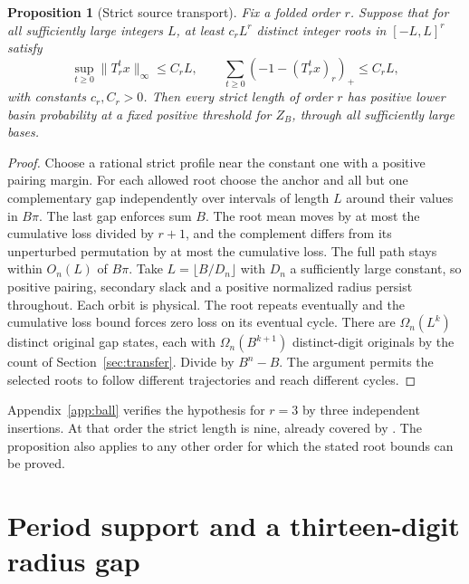 \documentclass[11pt,reqno]{amsart}
\newtheorem{proposition}[theorem]{Proposition}
\theoremstyle{definition}
\begin{document}
\begin{proposition}[Strict source transport]\label{prop:source}
Fix a folded order \(r\). Suppose that for all sufficiently large integers \(L\), at least \(c_rL^r\) distinct integer roots in \([-L,L]^r\) satisfy
\[
 \sup_{t\ge0}\|T_r^t x\|_\infty\le C_rL,\qquad
 \sum_{t\ge0}(-1-(T_r^t x)_r)_+\le C_rL,
\]
with constants \(c_r,C_r>0\). Then every strict length of order \(r\) has positive lower basin probability at a fixed positive threshold for \(Z_B\), through all sufficiently large bases.
\end{proposition}
\begin{proof}
Choose a rational strict profile near the constant one with a positive pairing margin. For each allowed root choose the anchor and all but one complementary gap independently over intervals of length \(L\) around their values in \(B\pi\). The last gap enforces sum \(B\). The root mean moves by at most the cumulative loss divided by \(r+1\), and the complement differs from its unperturbed permutation by at most the cumulative loss. The full path stays within \(O_n(L)\) of \(B\pi\). Take \(L=\lfloor B/D_n\rfloor\) with \(D_n\) a sufficiently large constant, so positive pairing, secondary slack and a positive normalized radius persist throughout. Each orbit is physical. The root repeats eventually and the cumulative loss bound forces zero loss on its eventual cycle. There are \(\Omega_n(L^k)\) distinct original gap states, each with \(\Omega_n(B^{k+1})\) distinct-digit originals by the count of Section~\ref{sec:transfer}. Divide by \(B^n-B\). The argument permits the selected roots to follow different trajectories and reach different cycles.
\end{proof}
Appendix~\ref{app:ball} verifies the hypothesis for \(r=3\) by three independent insertions. At that order the strict length is nine, already covered by \cite{G9}. The proposition also applies to any other order for which the stated root bounds can be proved.

\section{Period support and a thirteen-digit radius gap}\label{sec:period}
\end{document}
